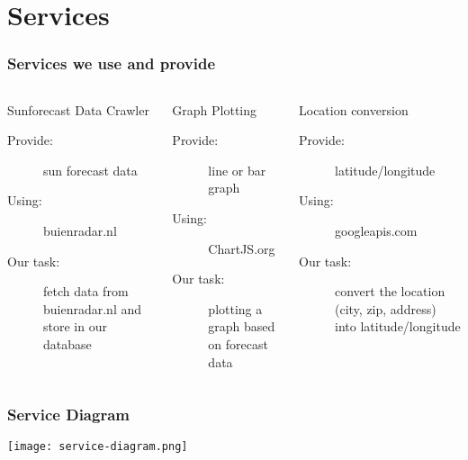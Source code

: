 \documentclass{beamer}
\begin{document}
\section{Services}
\frame
{
\frametitle{Services we use and provide}\begin{columns}[c]  
    \begin{block}{Sunforecast Data Crawler}
	\begin{description}
	  \item[Provide:] sun forecast data
	  \item[Using:] buienradar.nl
	  \item[Our task:] fetch data from buienradar.nl and store in our database
	 \end{description}
     \end{block}
     \begin{block}{Graph Plotting}
	\begin{description} 
	  \item[Provide:] line or bar graph
	  \item[Using:] ChartJS.org
	  \item[Our task:] plotting a graph based on forecast data
	\end{description}
     \end{block}
   \begin{block}{Location conversion}
     \begin{description}  
	\item[Provide:] latitude/longitude
	\item[Using:] googleapis.com
	\item[Our task:] convert the location (city, zip, address) into latitude/longitude
     \end{description}
   \end{block}
 \end{columns}
}


\begin{frame}
 
 \frametitle{Service Diagram}
 \begin{center}
   \texttt{[image: service-diagram.png]}
 \end{center}

\end{frame}

 
 
      
\end{document}
